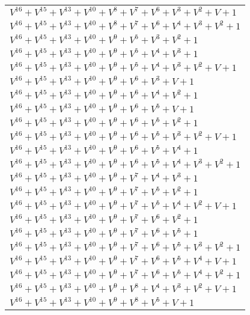 \documentclass[12pt]{article}
\begin{document}
\begin{adjustwidth}{-4cm}{}
\begin{center}
\begin{longtable}{|l|}
$V^{16}  +V^{15}  +V^{13}  +V^{10}  +V^{8}  +V^{7}  +V^{6}  +V^{3}  +V^{2}  + V + 1$ \\
$V^{16}  +V^{15}  +V^{13}  +V^{10}  +V^{8}  +V^{7}  +V^{6}  +V^{4}  +V^{3}  +V^{2}  + 1$ \\
$V^{16}  +V^{15}  +V^{13}  +V^{10}  +V^{9}  +V^{5}  +V^{3}  +V^{2}  + 1$ \\
$V^{16}  +V^{15}  +V^{13}  +V^{10}  +V^{9}  +V^{5}  +V^{4}  +V^{3}  + 1$ \\
$V^{16}  +V^{15}  +V^{13}  +V^{10}  +V^{9}  +V^{5}  +V^{4}  +V^{3}  +V^{2}  + V + 1$ \\
$V^{16}  +V^{15}  +V^{13}  +V^{10}  +V^{9}  +V^{6}  +V^{3}  + V + 1$ \\
$V^{16}  +V^{15}  +V^{13}  +V^{10}  +V^{9}  +V^{6}  +V^{4}  +V^{2}  + 1$ \\
$V^{16}  +V^{15}  +V^{13}  +V^{10}  +V^{9}  +V^{6}  +V^{5}  + V + 1$ \\
$V^{16}  +V^{15}  +V^{13}  +V^{10}  +V^{9}  +V^{6}  +V^{5}  +V^{2}  + 1$ \\
$V^{16}  +V^{15}  +V^{13}  +V^{10}  +V^{9}  +V^{6}  +V^{5}  +V^{3}  +V^{2}  + V + 1$ \\
$V^{16}  +V^{15}  +V^{13}  +V^{10}  +V^{9}  +V^{6}  +V^{5}  +V^{4}  + 1$ \\
$V^{16}  +V^{15}  +V^{13}  +V^{10}  +V^{9}  +V^{6}  +V^{5}  +V^{4}  +V^{3}  +V^{2}  + 1$ \\
$V^{16}  +V^{15}  +V^{13}  +V^{10}  +V^{9}  +V^{7}  +V^{4}  +V^{3}  + 1$ \\
$V^{16}  +V^{15}  +V^{13}  +V^{10}  +V^{9}  +V^{7}  +V^{5}  +V^{2}  + 1$ \\
$V^{16}  +V^{15}  +V^{13}  +V^{10}  +V^{9}  +V^{7}  +V^{5}  +V^{4}  +V^{2}  + V + 1$ \\
$V^{16}  +V^{15}  +V^{13}  +V^{10}  +V^{9}  +V^{7}  +V^{6}  +V^{2}  + 1$ \\
$V^{16}  +V^{15}  +V^{13}  +V^{10}  +V^{9}  +V^{7}  +V^{6}  +V^{5}  + 1$ \\
$V^{16}  +V^{15}  +V^{13}  +V^{10}  +V^{9}  +V^{7}  +V^{6}  +V^{5}  +V^{3}  +V^{2}  + 1$ \\
$V^{16}  +V^{15}  +V^{13}  +V^{10}  +V^{9}  +V^{7}  +V^{6}  +V^{5}  +V^{4}  + V + 1$ \\
$V^{16}  +V^{15}  +V^{13}  +V^{10}  +V^{9}  +V^{7}  +V^{6}  +V^{5}  +V^{4}  +V^{2}  + 1$ \\
$V^{16}  +V^{15}  +V^{13}  +V^{10}  +V^{9}  +V^{8}  +V^{4}  +V^{3}  +V^{2}  + V + 1$ \\
$V^{16}  +V^{15}  +V^{13}  +V^{10}  +V^{9}  +V^{8}  +V^{5}  + V + 1$ \\

\end{longtable}
\end{center}
\end{adjustwidth}
\end{document}
